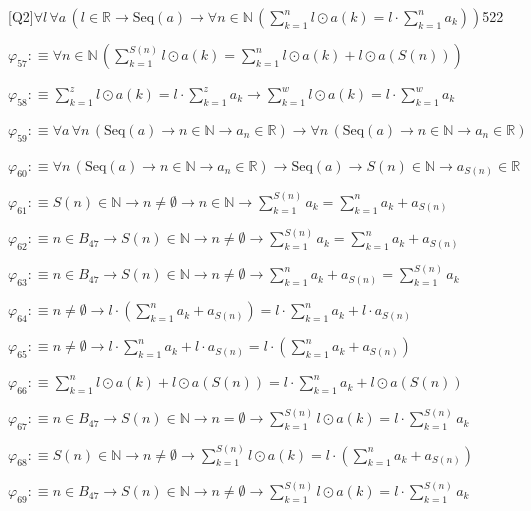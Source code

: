 \begin{fullproof}{[Q2]}{$\forall l\,\forall a\,(l \in \mathbb{R} \to \mathrm{Seq}(a) \to \forall n \in \mathbb{N}\,({\textstyle\sum_{k=1}^{n} l \odot a(k)} = l \cdot {\textstyle\sum_{k=1}^{n} a_{k}}))$}{522}
\begin{abbrevlist}
\item $\varphi_{57} :\equiv \forall n \in \mathbb{N}\,({\textstyle\sum_{k=1}^{S(n)} l \odot a(k)} = {\textstyle\sum_{k=1}^{n} l \odot a(k)} + l \odot a(S(n)))$
\item $\varphi_{58} :\equiv {\textstyle\sum_{k=1}^{z} l \odot a(k)} = l \cdot {\textstyle\sum_{k=1}^{z} a_{k}} \to {\textstyle\sum_{k=1}^{w} l \odot a(k)} = l \cdot {\textstyle\sum_{k=1}^{w} a_{k}}$
\item $\varphi_{59} :\equiv \forall a\,\forall n\,(\mathrm{Seq}(a) \to n \in \mathbb{N} \to a_{n} \in \mathbb{R}) \to \forall n\,(\mathrm{Seq}(a) \to n \in \mathbb{N} \to a_{n} \in \mathbb{R})$
\item $\varphi_{60} :\equiv \forall n\,(\mathrm{Seq}(a) \to n \in \mathbb{N} \to a_{n} \in \mathbb{R}) \to \mathrm{Seq}(a) \to S(n) \in \mathbb{N} \to a_{S(n)} \in \mathbb{R}$
\item $\varphi_{61} :\equiv S(n) \in \mathbb{N} \to n \neq \emptyset \to n \in \mathbb{N} \to {\textstyle\sum_{k=1}^{S(n)} a_{k}} = {\textstyle\sum_{k=1}^{n} a_{k}} + a_{S(n)}$
\item $\varphi_{62} :\equiv n \in B_{47} \to S(n) \in \mathbb{N} \to n \neq \emptyset \to {\textstyle\sum_{k=1}^{S(n)} a_{k}} = {\textstyle\sum_{k=1}^{n} a_{k}} + a_{S(n)}$
\item $\varphi_{63} :\equiv n \in B_{47} \to S(n) \in \mathbb{N} \to n \neq \emptyset \to {\textstyle\sum_{k=1}^{n} a_{k}} + a_{S(n)} = {\textstyle\sum_{k=1}^{S(n)} a_{k}}$
\item $\varphi_{64} :\equiv n \neq \emptyset \to l \cdot ({\textstyle\sum_{k=1}^{n} a_{k}} + a_{S(n)}) = l \cdot {\textstyle\sum_{k=1}^{n} a_{k}} + l \cdot a_{S(n)}$
\item $\varphi_{65} :\equiv n \neq \emptyset \to l \cdot {\textstyle\sum_{k=1}^{n} a_{k}} + l \cdot a_{S(n)} = l \cdot ({\textstyle\sum_{k=1}^{n} a_{k}} + a_{S(n)})$
\item $\varphi_{66} :\equiv {\textstyle\sum_{k=1}^{n} l \odot a(k)} + l \odot a(S(n)) = l \cdot {\textstyle\sum_{k=1}^{n} a_{k}} + l \odot a(S(n))$
\item $\varphi_{67} :\equiv n \in B_{47} \to S(n) \in \mathbb{N} \to n = \emptyset \to {\textstyle\sum_{k=1}^{S(n)} l \odot a(k)} = l \cdot {\textstyle\sum_{k=1}^{S(n)} a_{k}}$
\item $\varphi_{68} :\equiv S(n) \in \mathbb{N} \to n \neq \emptyset \to {\textstyle\sum_{k=1}^{S(n)} l \odot a(k)} = l \cdot ({\textstyle\sum_{k=1}^{n} a_{k}} + a_{S(n)})$
\item $\varphi_{69} :\equiv n \in B_{47} \to S(n) \in \mathbb{N} \to n \neq \emptyset \to {\textstyle\sum_{k=1}^{S(n)} l \odot a(k)} = l \cdot {\textstyle\sum_{k=1}^{S(n)} a_{k}}$

\end{abbrevlist}
\end{fullproof}
